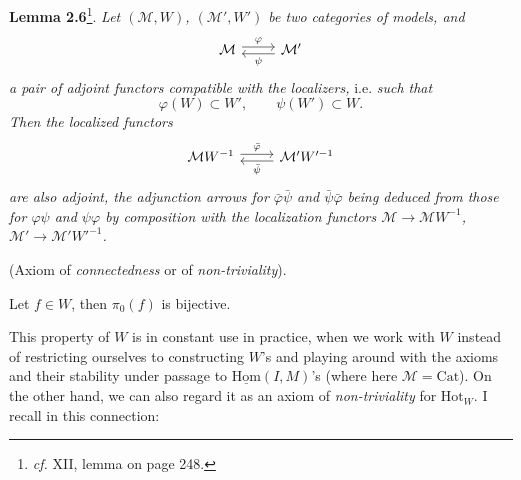 \documentclass[11pt]{article}
\newcommand{\msp}[1]{\marginpar{\footnotesize [#1]}}
\begin{document}
\textbf{Lemma 2.6}\footnote{\textit{cf.} XII, lemma on page 248.}. \textit{Let $(\mathcal{M}, W)$, $(\mathcal{M}', W')$ be two categories of models, and}
\[
\begin{tikzcd}
\mathcal{M} \arrow[r, shift left, "\varphi"] & \mathcal{M}' \arrow[l, shift left, "\psi"]
\end{tikzcd}
\]
\textit{a pair of adjoint functors compatible with the localizers,} i.e. \textit{such that}
\[
\varphi(W) \subset W', \qquad \psi(W') \subset W.
\]
\textit{Then the localized functors}
\[
\begin{tikzcd}
\mathcal{M}W^{-1} \arrow[r, shift left, "\bar{\varphi}"] & \mathcal{M}'W'^{-1} \arrow[l, shift left, "\bar{\psi}"]
\end{tikzcd}
\]
\textit{are also adjoint, the adjunction arrows for $\bar{\varphi}\bar{\psi}$ and $\bar{\psi}\bar{\varphi}$ being deduced from those for $\varphi\psi$ and $\psi\varphi$ by composition with the localization functors $\mathcal{M} \longrightarrow \mathcal{M}W^{-1}$, $\mathcal{M}' \longrightarrow \mathcal{M}'W'^{-1}$.}

\begin{description}[leftmargin=7em, labelwidth=6em]
\item[Loc (5)] \msp{page 12}(Axiom of \textit{connectedness} or of \textit{non-triviality}).

Let $f \in W$, then $\pi_0(f)$ is bijective.
\end{description}

This property of $W$ is in constant use in practice, when we work with $W$ instead of restricting ourselves to constructing $W$'s and playing around with the axioms and their stability under passage to $\underline{\mathrm{Hom}}(I, M)$'s (where here $\mathcal{M} = \mathrm{Cat}$). On the other hand, we can also regard it as an axiom of \textit{non-triviality} for $\mathrm{Hot}_W$. I recall in this connection:
\end{document}

